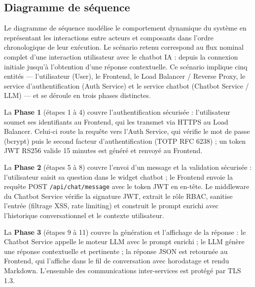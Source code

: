 \subsection{Diagramme de séquence}
Le diagramme de séquence modélise le comportement dynamique du système en représentant les interactions entre acteurs et composants dans l'ordre chronologique de leur exécution. Le scénario retenu correspond au flux nominal complet d'une interaction utilisateur avec le chatbot IA : depuis la connexion initiale jusqu'à l'obtention d'une réponse contextuelle. Ce scénario implique cinq entités — l'utilisateur (User), le Frontend, le Load Balancer / Reverse Proxy, le service d'authentification (Auth Service) et le service chatbot (Chatbot Service / LLM) — et se déroule en trois phases distinctes.

La \textbf{Phase 1} (étapes 1 à 4) couvre l'authentification sécurisée : l'utilisateur soumet ses identifiants au Frontend, qui les transmet via HTTPS au Load Balancer. Celui-ci route la requête vers l'Auth Service, qui vérifie le mot de passe (bcrypt) puis le second facteur d'authentification (TOTP RFC 6238) ; un token JWT RS256 valide 15 minutes est généré et renvoyé au Frontend.

La \textbf{Phase 2} (étapes 5 à 8) couvre l'envoi d'un message et la validation sécurisée : l'utilisateur saisit sa question dans le widget chatbot ; le Frontend envoie la requête POST \texttt{/api/chat/message} avec le token JWT en en-tête. Le middleware du Chatbot Service vérifie la signature JWT, extrait le rôle RBAC, sanitise l'entrée (filtrage XSS, rate limiting) et construit le prompt enrichi avec l'historique conversationnel et le contexte utilisateur.

La \textbf{Phase 3} (étapes 9 à 11) couvre la génération et l'affichage de la réponse : le Chatbot Service appelle le moteur LLM avec le prompt enrichi ; le LLM génère une réponse contextuelle et pertinente ; la réponse JSON est retournée au Frontend, qui l'affiche dans le fil de conversation avec horodatage et rendu Markdown. L'ensemble des communications inter-services est protégé par TLS 1.3.


